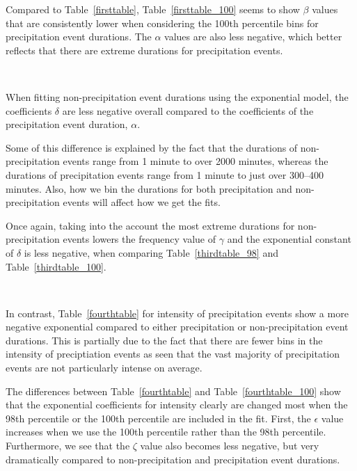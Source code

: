 \documentclass[11pt]{report}
\begin{document}
Compared to Table~\ref{firsttable}, Table~\ref{firsttable_100} seems to show
$\beta$ values that are consistently lower when considering the 100th
percentile bins for precipitation event durations. The $\alpha$ values are
also less negative, which better reflects that there are extreme durations
for precipitation events.

\ 





When fitting non-precipitation event durations using the exponential model,
the coefficients $\delta$ are less negative overall compared to the
coefficients of the precipitation event duration, $\alpha$.

Some of this difference is explained by the fact that the durations of
non-precipitation events range from 1 minute to over 2000 minutes, whereas
the durations of precipitation events range from 1 minute to just over
300--400 minutes. Also, how we bin the durations for both precipitation and
non-precipitation events will affect how we get the fits.

Once again, taking into the account the most extreme durations for
non-precipitation events lowers the frequency value of $\gamma$ and the
exponential constant of $\delta$ is less negative, when comparing
Table~\ref{thirdtable_98} and Table~\ref{thirdtable_100}.

\





In contrast, Table~\ref{fourthtable} for intensity of precipitation events
show a more negative exponential compared to either precipitation or
non-precipitation event durations. This is partially due to the fact that
there are fewer bins in the intensity of preciptiation events as seen that
the vast majority of precipitation events are not particularly intense on
average.

The differences between Table~\ref{fourthtable} and
Table~\ref{fourthtable_100} show that the exponential coefficients for
intensity clearly are changed most when the 98th percentile or the 100th
percentile are included in the fit. First, the $\epsilon$ value increases
when we use the 100th percentile rather than the 98th
percentile. Furthermore, we see that the $\zeta$ value also becomes less
negative, but very dramatically compared to non-precipitation and
precipitation event durations.
\end{document}
